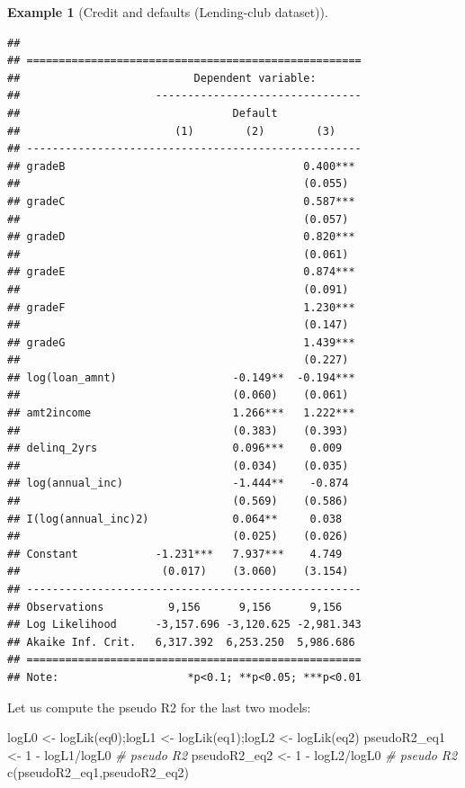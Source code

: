 \documentclass[
  12pt,
]{book}
\newenvironment{Shaded}{\begin{snugshade}}{\end{snugshade}}
\newcommand{\CommentTok}[1]{\textcolor[rgb]{0.56,0.35,0.01}{\textit{#1}}}
\newcommand{\DecValTok}[1]{\textcolor[rgb]{0.00,0.00,0.81}{#1}}
\newcommand{\FunctionTok}[1]{\textcolor[rgb]{0.00,0.00,0.00}{#1}}
\newcommand{\NormalTok}[1]{#1}
\newcommand{\OtherTok}[1]{\textcolor[rgb]{0.56,0.35,0.01}{#1}}
\newcommand{\SpecialCharTok}[1]{\textcolor[rgb]{0.00,0.00,0.00}{#1}}
\theoremstyle{definition}
\theoremstyle{definition}
\newtheorem{example}{Example}[chapter]
\theoremstyle{definition}
\theoremstyle{definition}
\theoremstyle{remark}
\begin{document}
\begin{example}[Credit and defaults (Lending-club dataset)]
\begin{verbatim}
## 
## ====================================================
##                           Dependent variable:       
##                     --------------------------------
##                                 Default             
##                        (1)        (2)        (3)    
## ----------------------------------------------------
## gradeB                                     0.400*** 
##                                            (0.055)  
## gradeC                                     0.587*** 
##                                            (0.057)  
## gradeD                                     0.820*** 
##                                            (0.061)  
## gradeE                                     0.874*** 
##                                            (0.091)  
## gradeF                                     1.230*** 
##                                            (0.147)  
## gradeG                                     1.439*** 
##                                            (0.227)  
## log(loan_amnt)                  -0.149**  -0.194*** 
##                                 (0.060)    (0.061)  
## amt2income                      1.266***   1.222*** 
##                                 (0.383)    (0.393)  
## delinq_2yrs                     0.096***    0.009   
##                                 (0.034)    (0.035)  
## log(annual_inc)                 -1.444**    -0.874  
##                                 (0.569)    (0.586)  
## I(log(annual_inc)2)             0.064**     0.038   
##                                 (0.025)    (0.026)  
## Constant            -1.231***   7.937***    4.749   
##                      (0.017)    (3.060)    (3.154)  
## ----------------------------------------------------
## Observations          9,156      9,156      9,156   
## Log Likelihood      -3,157.696 -3,120.625 -2,981.343
## Akaike Inf. Crit.   6,317.392  6,253.250  5,986.686 
## ====================================================
## Note:                    *p<0.1; **p<0.05; ***p<0.01
\end{verbatim}

Let us compute the pseudo R2 for the last two models:

\begin{Shaded}
\begin{Highlighting}[]
\NormalTok{logL0 }\OtherTok{\textless{}{-}} \FunctionTok{logLik}\NormalTok{(eq0);logL1 }\OtherTok{\textless{}{-}} \FunctionTok{logLik}\NormalTok{(eq1);logL2 }\OtherTok{\textless{}{-}} \FunctionTok{logLik}\NormalTok{(eq2)}
\NormalTok{pseudoR2\_eq1 }\OtherTok{\textless{}{-}} \DecValTok{1} \SpecialCharTok{{-}}\NormalTok{ logL1}\SpecialCharTok{/}\NormalTok{logL0 }\CommentTok{\# pseudo R2}
\NormalTok{pseudoR2\_eq2 }\OtherTok{\textless{}{-}} \DecValTok{1} \SpecialCharTok{{-}}\NormalTok{ logL2}\SpecialCharTok{/}\NormalTok{logL0 }\CommentTok{\# pseudo R2}
\FunctionTok{c}\NormalTok{(pseudoR2\_eq1,pseudoR2\_eq2)}
\end{Highlighting}
\end{Shaded}


\end{example}
\end{document}
